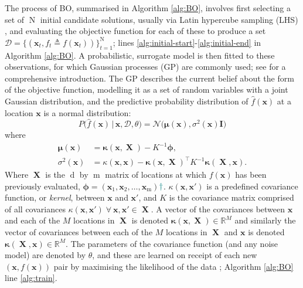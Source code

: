 \documentclass[conference]{IEEEtran}
\DeclareMathOperator*{\evaluatedx}{\bX}
\DeclareMathOperator*{\ninitialevaluations}{N}
\DeclareMathOperator*{\nevaluations}{m}
\DeclareMathOperator*{\ndim}{d}
\newcommand\gp{GP\xspace}
\newcommand{\given}{\,|\,}
\newcommand{\bx}{\mathbf{x}}
\newcommand{\bX}{\mathbf{X}}
\newcommand{\bI}{\mathbf{I}}
\newcommand{\bmu}{\boldsymbol{\mu}}
\newcommand{\bphi}{\boldsymbol{\phi}}
\newcommand{\fnote}[2][\textcolor{teal}{\dagger}]{$#1$\marginpar{\color{teal}\raggedright\tiny$#1$
    #2}}
\begin{document}
The process of BO, summarised in Algorithm \ref{alg:BO}, involves first selecting a set of $\ninitialevaluations$ initial candidate solutions, usually via Latin hypercube sampling (LHS) \cite{mckay2000comparison}, and evaluating the objective function for each of these to produce a set $\mathcal{D} = \{ (\bx_t, f_t \triangleq f(\bx_t) )\}_{t=1}^{\ninitialevaluations}$; lines \ref{alg:initial-start}-\ref{alg:initial-end} in Algorithm \ref{alg:BO}. A probabilistic, surrogate model is then fitted to these observations, for which  Gaussian processes (\gp) are commonly used; see \cite{rasmussen2003gaussian} for a comprehensive introduction.
The \gp describes the current belief about the form of the objective function, modelling it as a set of random variables with a joint Gaussian distribution, and the predictive probability distribution of $\hat{f}(\bx)$ at a location $\bx$ is a normal distribution:
\begin{equation}\label{eqn: P(f_t+1)}
P\big(\hat{f}(\mathbf{x}) \given \mathbf{x}, \mathcal{D}, \theta \big) = 
\mathcal{N}\big(\bmu(\mathbf{x}), \sigma^2(\mathbf{x})\bI\big)
\end{equation}
where
\begin{align}\label{eqn: mu}
\bmu(\mathbf{x}) &= \boldsymbol{\kappa}(\mathbf{x}, \evaluatedx) - K^{-1}  \bphi,\\
\label{eqn: sigma}
\sigma^2(\mathbf{x}) &= \kappa(\mathbf{x}, \mathbf{x}) - \boldsymbol{\kappa}(\mathbf{x}, \evaluatedx)^{\top}K^{-1} \boldsymbol{\kappa}(\evaluatedx, \mathbf{x}).
\end{align}
Where $\evaluatedx$ is the $\ndim$ by $\nevaluations$ matrix of locations at which $f(\bx)$ has
been previously evaluated, $\bphi = (\bx_1, \bx_2, \ldots, \bx_{\nevaluations})$\fnote{check $\nevaluations$ correct here?}.
$\kappa(\mathbf{x}, \mathbf{x}')$ is a predefined
covariance function, or  \textit{kernel}, between $\mathbf{x}$ and
$\mathbf{x}'$, and  $K$ is the covariance matrix comprised of all
covariances $\kappa(\mathbf{x}, \mathbf{x}') \; \forall \: \mathbf{x},
\mathbf{x}'\in \evaluatedx$. A vector of the covariances between
$\mathbf{x}$ and each of the $M$ locations in $\evaluatedx$ is denoted
$\boldsymbol{\kappa}(\mathbf{x}, \evaluatedx)\in \mathbb{R}^{M}$ and
similarly the vector of covariances between each of the $M$ locations in
$\evaluatedx$ and $\mathbf{x}$ is denoted $\boldsymbol{\kappa}(\evaluatedx,
\mathbf{x}) \in \mathbb{R}^{M}$. The parameters of the covariance function
(and any noise model) are denoted by $\theta$, and these are learned on receipt of each new $(\bx, f(\bx))$ pair by maximising the likelihood of the data \cite{rasmussen2003gaussian}; Algorithm \ref{alg:BO} line \ref{alg:train}. 
\end{document}
